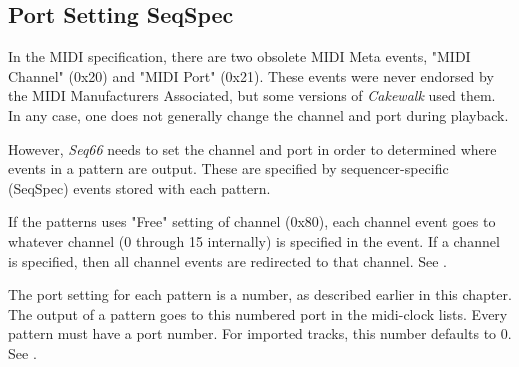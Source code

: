 \subsection{Port Setting SeqSpec}
\label{subsec:port_seqspec}

   In the MIDI specification, there are two obsolete MIDI Meta events,
   "MIDI Channel" (0x20) and "MIDI Port" (0x21).
   These events were never endorsed by the MIDI Manufacturers Associated,
   but some versions of \textsl{Cakewalk} used them.
   In any case, one does not generally change the channel and port during
   playback.

   However, \textsl{Seq66} needs to set the channel and port in order to
   determined where events in a pattern are output.
   These are specified by sequencer-specific (SeqSpec) events stored with
   each pattern.

   If the patterns uses "Free" setting of channel (0x80), each channel event
   goes to whatever channel (0 through 15 internally) is specified in the event.
   If a channel is specified, then all channel events are redirected to that
   channel.
   See .

   The port setting for each pattern is a number, as described earlier in
   this chapter.
   The output of a pattern goes to this numbered port in the midi-clock
   lists.
   Every pattern must have a port number.
   For imported tracks, this number defaults to 0.
   See .

